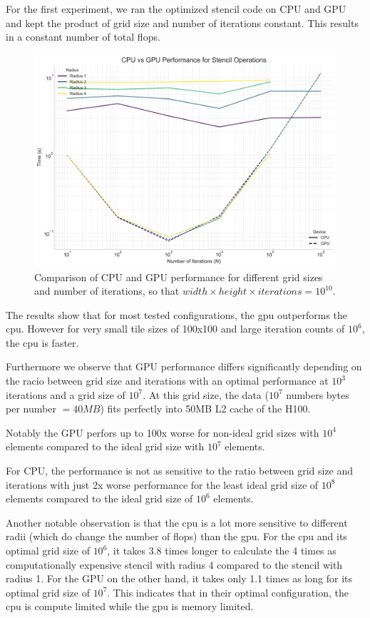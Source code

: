 \documentclass{article}
\begin{document}
For the first experiment, we ran the optimized stencil code on CPU and GPU and kept the product of grid size and number of iterations constant. This results in a constant number of total flops. 

\begin{figure}[h]
    \centering
    \includegraphics[width=0.5\linewidth]{plots/gpu_cpu_constant_product.png}
    \caption{Comparison of CPU and GPU performance for different grid sizes and number of iterations, so that $width \times height \times iterations = 10^10$.}
    \label{fig:gpu_cpu_constant_product}
\end{figure}

The results show that for most tested configurations, the gpu outperforms the cpu.
However for very small tile sizes of 100x100 and large iteration counts of $10^6$, the cpu is faster.

Furthermore we observe that GPU performance differs significantly depending on the racio between grid size and iterations with an optimal performance at $10^3$ iterations and a grid size of $10^7$. At this grid size, the data ($10^7$ numbers  bytes per number $=40MB$) fits perfectly into 50MB L2 cache of the H100. 

Notably the GPU perfors up to 100x worse for non-ideal grid sizes with $10^4$ elements compared to the ideal grid size with $10^7$ elements.

For CPU, the performance is not as sensitive to the ratio between grid size and iterations with just 2x worse performance for the least ideal grid size of $10^8$ elements compared to the ideal grid size of $10^6$ elements.

Another notable observation is that the cpu is a lot more sensitive to different radii (which do change the number of flops) than the gpu. For the cpu and its optimal grid size of $10^6$, it takes 3.8 times longer to calculate the 4 times as computationally expensive stencil with radius 4 compared to the stencil with radius 1. For the GPU on the other hand, it takes only 1.1 times as long for its optimal grid size of $10^7$.
This indicates that in their optimal configuration, the cpu is compute limited while the gpu is memory limited.
\end{document}
